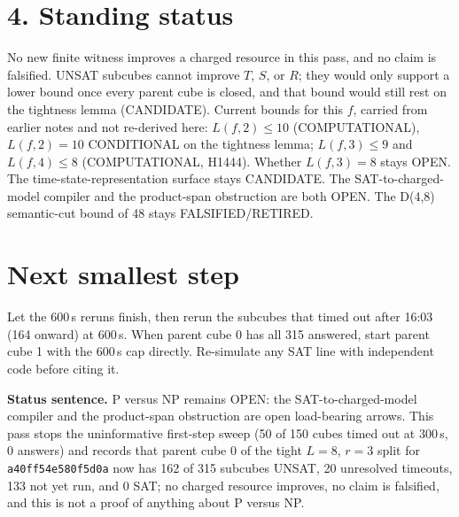 \documentclass[11pt]{article}
\begin{document}
\section*{4. Standing status}
No new finite witness improves a charged resource in this pass, and no claim is falsified. UNSAT subcubes cannot improve $T$, $S$, or $R$; they would only support a lower bound once every parent cube is closed, and that bound would still rest on the tightness lemma (CANDIDATE). Current bounds for this $f$, carried from earlier notes and not re-derived here: $L(f,2)\le 10$ (COMPUTATIONAL), $L(f,2)=10$ CONDITIONAL on the tightness lemma; $L(f,3)\le 9$ and $L(f,4)\le 8$ (COMPUTATIONAL, H1444). Whether $L(f,3)=8$ stays OPEN. The time-state-representation surface stays CANDIDATE. The SAT-to-charged-model compiler and the product-span obstruction are both OPEN. The D(4,8) semantic-cut bound of 48 stays FALSIFIED/RETIRED.

\section*{Next smallest step}
Let the 600\,s reruns finish, then rerun the subcubes that timed out after 16:03 (164 onward) at 600\,s. When parent cube 0 has all 315 answered, start parent cube 1 with the 600\,s cap directly. Re-simulate any SAT line with independent code before citing it.

\bigskip
\noindent\textbf{Status sentence.} P versus NP remains OPEN: the SAT-to-charged-model compiler and the product-span obstruction are open load-bearing arrows. This pass stops the uninformative first-step sweep (50 of 150 cubes timed out at 300\,s, 0 answers) and records that parent cube 0 of the tight $L=8$, $r=3$ split for \texttt{a40ff54e580f5d0a} now has 162 of 315 subcubes UNSAT, 20 unresolved timeouts, 133 not yet run, and 0 SAT; no charged resource improves, no claim is falsified, and this is not a proof of anything about P versus NP.
\end{document}
